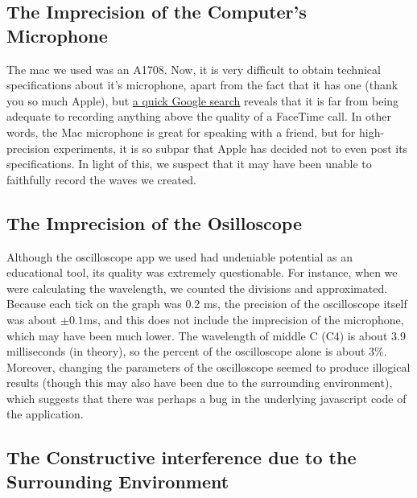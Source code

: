 \documentclass[12pt,oneside]{article}
\begin{document}
\par

\hypertarget{the-imprecision-of-the-computers-microphone}{%
\subsection*{The Imprecision of the Computer's
Microphone}\label{the-imprecision-of-the-computers-microphone}}

The mac we used was an A1708. Now, it is very difficult to obtain
technical specifications about it's microphone, apart from the fact that
it has one (thank you so much Apple), but
\href{https://www.macworld.com/article/2367142/understanding-the-limitations-of-a-macs-microphone.html}{a
quick Google search} reveals that it is far from being adequate to
recording anything above the quality of a FaceTime call. In other words,
the Mac microphone is great for speaking with a friend, but for
high-precision experiments, it is so subpar that Apple has decided not
to even post its specifications. In light of this, we suspect that it
may have been unable to faithfully record the waves we created.

\hypertarget{the-imprecision-of-the-osilloscope}{%
\subsection*{The Imprecision of the
Osilloscope}\label{the-imprecision-of-the-osilloscope}}

Although the oscilloscope app we used had undeniable potential as an
educational tool, its quality was extremely questionable. For instance,
when we were calculating the wavelength, we counted the divisions and
approximated. Because each tick on the graph was 0.2 ms, the precision
of the oscilloscope itself was about \(\pm 0.1\)ms, and this does not
include the imprecision of the microphone, which may have been much
lower. The wavelength of middle C (C4) is about 3.9 milliseconds (in
theory), so the percent of the oscilloscope alone is about 3\%.
Moreover, changing the parameters of the oscilloscope seemed to produce
illogical results (though this may also have been due to the surrounding
environment), which suggests that there was perhaps a bug in the
underlying javascript code of the application.

\hypertarget{the-constructive-interference-due-to-the-surrounding-environment}{%
\subsection*{The Constructive interference due to the Surrounding
Environment}\label{the-constructive-interference-due-to-the-surrounding-environment}}
\end{document}
